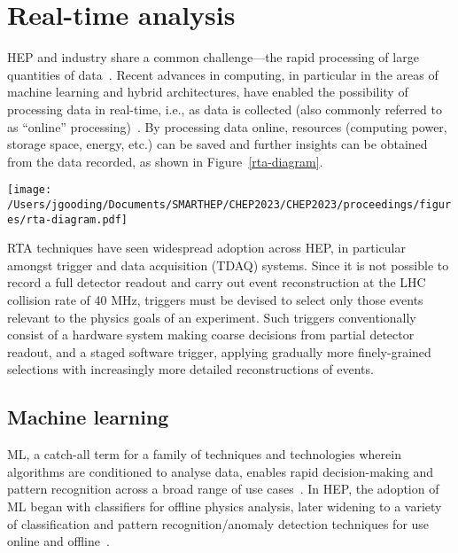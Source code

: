 \section{Real-time analysis}
\label{rta}
HEP and industry share a common challenge—the rapid processing of large quantities of data~\cite{hu-big-data}. Recent advances in computing, in particular in the areas of machine learning and hybrid architectures, have enabled the possibility of processing data in real-time, i.e., as data is collected (also commonly referred to as ``online'' processing)~\cite{real-time-computing}. By processing data online, resources (computing power, storage space, energy, etc.) can be saved and further insights can be obtained from the data recorded, as shown in Figure~\ref{rta-diagram}.

\begin{figure*}[h!]
    \centering
    \texttt{[image: /Users/jgooding/Documents/SMARTHEP/CHEP2023/CHEP2023/proceedings/figures/rta-diagram.pdf]}
    \caption{Traditional and RTA approaches to data processing. Traditional approaches rely on recording all data and processing this offline; in RTA, data is processed as it is produced, recording only the relevant portions, enabling greater volumes of processed data to be stored.}
    \label{rta-diagram}
\end{figure*}

RTA techniques have seen widespread adoption across HEP, in particular amongst trigger and data acquisition (TDAQ) systems. Since it is not possible to record a full detector readout and carry out event reconstruction at the LHC collision rate of {40}{ MHz}, triggers must be devised to select only those events relevant to the physics goals of an experiment. Such triggers conventionally consist of a hardware system making coarse decisions from partial detector readout, and a staged software trigger, applying gradually more finely-grained selections with increasingly more detailed reconstructions of events.

\subsection{Machine learning}
\label{machine-learning}
ML, a catch-all term for a family of techniques and technologies wherein algorithms are conditioned to analyse data, enables rapid decision-making and pattern recognition across a broad range of use cases~\cite{intro-ml}. In HEP, the adoption of ML began with classifiers for offline physics analysis, later widening to a variety of classification and pattern recognition/anomaly detection techniques for use online and offline~\cite{albertsson-ml}.

